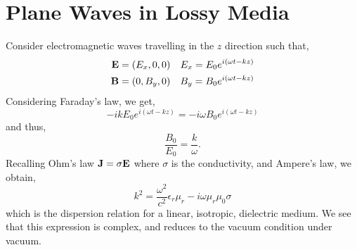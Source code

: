 \documentclass{book}
\begin{document}
\section{Plane Waves in Lossy Media}
Consider electromagnetic waves travelling in the $z$ direction such that,
\begin{align}
	\vb{E} = \left(E_x, 0, 0\right) && E_x = E_0e^{i(\omega t - kz)} \\
	\vb{B} = \left(0, B_y, 0\right) && B_y = B_0e^{i(\omega t - kz)}
\end{align}
Considering Faraday's law, we get,
\begin{equation}
	-ikE_0e^{i(\omega t - kz)} = -i\omega B_0 e^{i(\omega t - kz)}
\end{equation}
and thus,
\begin{equation}
	\frac{B_0}{E_0} = \frac{k}{\omega}.
\end{equation}
Recalling Ohm's law $\vb{J} = \sigma \vb{E}$ where $\sigma$ is the conductivity, and Ampere's law, we obtain,
\begin{equation}
	k^2 = \frac{\omega^2}{c^2} \epsilon_r\mu_r - i\omega \mu_r\mu_0 \sigma \label{eq:dispersion} 
\end{equation}
which is the dispersion relation for a linear, isotropic, dielectric medium. We see that this expression is complex, and reduces to the vacuum condition under vacuum. 
\end{document}
